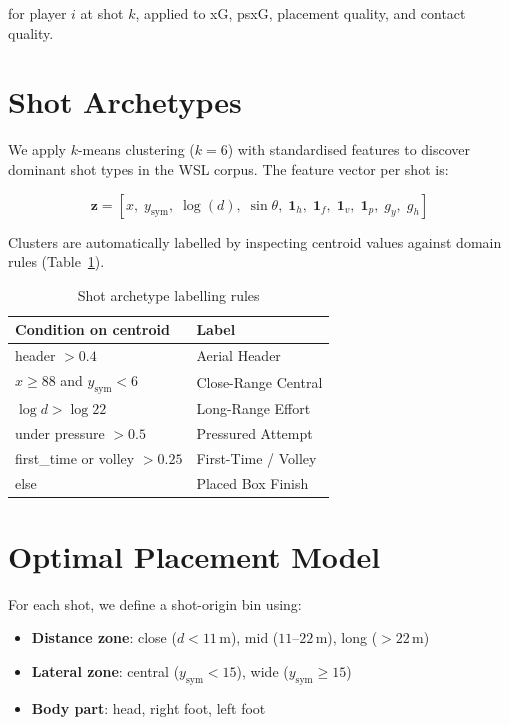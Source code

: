 \documentclass[12pt,a4paper]{article}
\begin{document}
for player $i$ at shot $k$, applied to xG, psxG, placement quality, and contact quality.

\section{Shot Archetypes}
\label{sec:archetypes}

We apply $k$-means clustering ($k=6$) with standardised features to discover dominant shot types in the WSL corpus. The feature vector per shot is:

\begin{equation}
\mathbf{z} = [x,\; y_\text{sym},\; \log(d),\; \sin\theta,\; \mathbf{1}_h,\; \mathbf{1}_f,\; \mathbf{1}_v,\; \mathbf{1}_p,\; g_y,\; g_h]
\end{equation}

Clusters are automatically labelled by inspecting centroid values against domain rules (Table~\ref{tab:archetypes}).

\begin{table}[H]
\centering
\caption{Shot archetype labelling rules}
\label{tab:archetypes}
\begin{tabular}{ll}
\toprule
\textbf{Condition on centroid} & \textbf{Label} \\
\midrule
header $> 0.4$                       & Aerial Header \\
$x \geq 88$ and $y_\text{sym} < 6$  & Close-Range Central \\
$\log d > \log 22$                   & Long-Range Effort \\
under pressure $> 0.5$               & Pressured Attempt \\
first\_time or volley $> 0.25$       & First-Time / Volley \\
else                                 & Placed Box Finish \\
\bottomrule
\end{tabular}
\end{table}

\section{Optimal Placement Model}
\label{sec:optimal}

For each shot, we define a shot-origin bin using:
\begin{itemize}
    \item \textbf{Distance zone}: close ($d < 11\,\text{m}$), mid ($11$--$22\,\text{m}$), long ($>22\,\text{m}$)
    \item \textbf{Lateral zone}: central ($y_\text{sym} < 15$), wide ($y_\text{sym} \geq 15$)
    \item \textbf{Body part}: head, right foot, left foot
\end{itemize}
\end{document}
